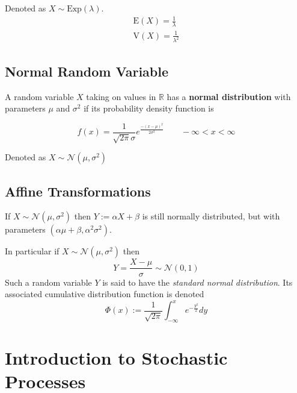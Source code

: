 \documentclass[11pt]{article}
\theoremstyle{definition}
\newcommand*\R{\mathbb{R}}
\begin{document}
Denoted as $X\sim \text{Exp}(\lambda)$.
\begin{align*}
	\text{E}(X) = \frac{1}{\lambda}\\
	\text{V}(X) = \frac{1}{\lambda^2}
\end{align*}

\subsection{Normal Random Variable}
A random variable $X$ taking on values in $\R$ has a \textbf{normal distribution} with parameters $\mu$ and $\sigma^2$ if its probability density function is

\begin{equation*}
	f(x) = \frac{1}{\sqrt{2\pi}\sigma} e^{\frac{-(x-\mu)^2 }{2\sigma^2}}\qquad -\infty<x<\infty
\end{equation*}

Denoted as $X \sim \mathcal{N}(\mu, \sigma^2)$

\subsection{Affine Transformations}
If $X\sim\mathcal{N}(\mu, \sigma^2)$ then $Y := \alpha X + \beta$ is still normally distributed, but with parameters $(\alpha\mu + \beta, \alpha^2 \sigma^2)$.

In particular if $X\sim \mathcal{N}(\mu, \sigma^2)$ then
\begin{equation*}
	Y = \frac{X-\mu}{\sigma} \sim \mathcal{N}(0,1)
\end{equation*}
Such a random variable $Y$ is said to have the \emph{standard normal distribution}. Its associated cumulative distribution function is denoted
\begin{equation*}
	\Phi(x) := \frac{1}{\sqrt{2\pi}}\int_{-\infty}^{x} e^{-\frac{y^2}{2}} dy
\end{equation*}

\section{Introduction to Stochastic Processes}
\end{document}
